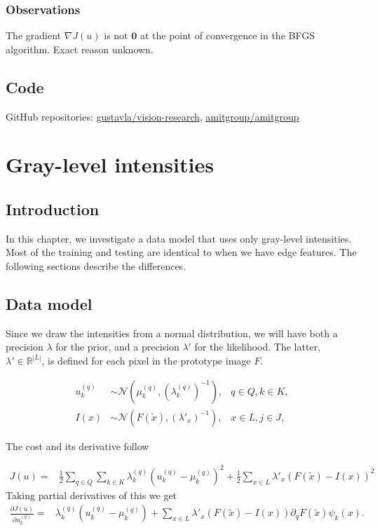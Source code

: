 \documentclass{report}
\begin{document}
\subsection{Observations}
The gradient $\nabla J(u)$ is not $\mathbf{0}$ at the point of convergence in the BFGS algorithm. Exact reason unknown.

\section{Code}
GitHub repositories: \href{https://github.com/gustavla/vision-research/}{gustavla/vision-research}, \href{https://github.com/amitgroup/amitgroup}{amitgroup/amitgroup}

\chapter{Gray-level intensities}

\section{Introduction}
In this chapter, we investigate a data model that uses only gray-level intensities. Most of the training and testing are identical to when we have edge features. The following sections describe the differences.

\section{Data model}
Since we draw the intensities from a normal distribution, we will have both a precision $\lambda$ for the prior, and a precision $\lambda'$ for the likelihood. The latter, $\lambda' \in \mathbb{R}^{|L|}$, is defined for each pixel in the prototype image $F$.

\begin{align}
    u^{(q)}_{k} &\sim \mathcal{N}(\mu^{(q)}_{k}, (\lambda^{(q)}_{k})^{-1}), &q \in Q, k \in K, \label{eq:gaussian} \\
    I(x) &\sim \mathcal{N}(F(\tilde x), (\lambda'_x)^{-1}), &x \in L, j \in J, \label{eq:bernoulli}
\end{align}

The cost and its derivative follow

\begin{align*}
    J(u) =& \frac{1}{2} \sum_{q\in Q} \sum_{k\in K} \lambda^{(q)}_k (u^{(q)}_k -\mu^{(q)}_k)^2 + \frac{1}{2} \sum_{x \in L} \lambda'_x 
            (F(\tilde x) - I(x))^2 
\end{align*}
Taking partial derivatives of this we get
\begin{align*}
    \frac{\partial J(u)}{\partial u^{(q)}_k} =& \lambda^{(q)}_k (u^{(q)}_k -\mu^{(q)}_k) + \sum_{x \in L} 
        \lambda'_x (F(\tilde x) - I(x)) \partial_q F(\tilde x) \psi_k(x).
\end{align*} 
\end{document}
